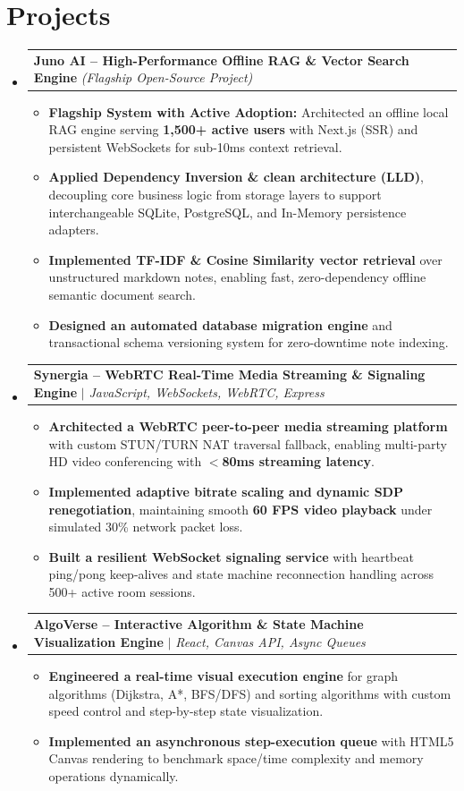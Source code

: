 \documentclass[letterpaper,10pt]{article}
\makeatletter
\newcommand{\resumeItem}[1]{
  \item\small{
    {#1 \vspace{-2pt}}
  }
}
\newcommand{\resumeProjectHeading}[2]{
    \vspace{-1pt}\item
    \begin{tabular*}{\textwidth}{l@{\extracolsep{\fill}}r}
      \small#1 & #2 \\
    \end{tabular*}\vspace{-5pt}
}
\newcommand{\resumeItemListStart}{\begin{itemize}[leftmargin=15pt, label={$\bullet$}]}
\newcommand{\resumeItemListEnd}{\end{itemize}\vspace{-5pt}}
\makeatother
\begin{document}
\section{Projects}
    \begin{itemize}[leftmargin=0.15in, label={}]
      \resumeProjectHeading
          {\textbf{Juno AI -- High-Performance Offline RAG \& Vector Search Engine} \emph{(Flagship Open-Source Project)}}{ }
          \resumeItemListStart
            \resumeItem{\textbf{Flagship System with Active Adoption:} Architected an offline local RAG engine serving \textbf{1,500+ active users} with Next.js (SSR) and persistent WebSockets for sub-10ms context retrieval.}
            \resumeItem{\textbf{Applied Dependency Inversion \& clean architecture (LLD)}, decoupling core business logic from storage layers to support interchangeable SQLite, PostgreSQL, and In-Memory persistence adapters.}
            \resumeItem{\textbf{Implemented TF-IDF \& Cosine Similarity vector retrieval} over unstructured markdown notes, enabling fast, zero-dependency offline semantic document search.}
            \resumeItem{\textbf{Designed an automated database migration engine} and transactional schema versioning system for zero-downtime note indexing.}
          \resumeItemListEnd

      \resumeProjectHeading
          {\textbf{Synergia -- WebRTC Real-Time Media Streaming \& Signaling Engine} $|$ \emph{JavaScript, WebSockets, WebRTC, Express}}{}
          \resumeItemListStart
            \resumeItem{\textbf{Architected a WebRTC peer-to-peer media streaming platform} with custom STUN/TURN NAT traversal fallback, enabling multi-party HD video conferencing with \textbf{$<$80ms streaming latency}.}
            \resumeItem{\textbf{Implemented adaptive bitrate scaling and dynamic SDP renegotiation}, maintaining smooth \textbf{60 FPS video playback} under simulated 30\% network packet loss.}
            \resumeItem{\textbf{Built a resilient WebSocket signaling service} with heartbeat ping/pong keep-alives and state machine reconnection handling across 500+ active room sessions.}
          \resumeItemListEnd

      \resumeProjectHeading
          {\textbf{AlgoVerse -- Interactive Algorithm \& State Machine Visualization Engine} $|$ \emph{React, Canvas API, Async Queues}}{}
          \resumeItemListStart
            \resumeItem{\textbf{Engineered a real-time visual execution engine} for graph algorithms (Dijkstra, A*, BFS/DFS) and sorting algorithms with custom speed control and step-by-step state visualization.}
            \resumeItem{\textbf{Implemented an asynchronous step-execution queue} with HTML5 Canvas rendering to benchmark space/time complexity and memory operations dynamically.}
          \resumeItemListEnd
    \end{itemize}
\end{document}
